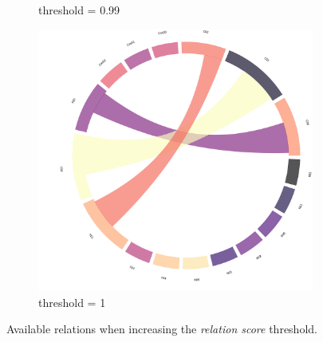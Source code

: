 \begin{figure}[!h]
\begin{subfigure}[b]{0.3\linewidth}
		\caption{threshold = 0.99}
	\end{subfigure}
	\hfill
	\begin{subfigure}[b]{0.3\linewidth}
		\includegraphics[width=\linewidth]{figures/chords/chord_swap_ensemble1000_RCN53333001.png}
		\caption{threshold = 1}
	\end{subfigure}
	
	\label{fig:tosaqui1}
	\caption{Available relations when increasing the \emph{relation score} threshold.}
\end{figure}